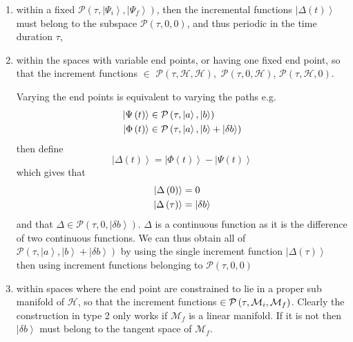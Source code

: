 \documentclass[aps,preprint]{revtex4}
\begin{document}
\begin{enumerate}
\item within a fixed $\mathcal{P}\left( \tau ,\left\vert \Psi
_{i}\right\rangle ,\left\vert \Psi _{f}\right\rangle \right) $, then the
incremental functions $\left\vert \Delta \left( t\right) \right\rangle $
must belong to the subspace $\mathcal{P}\left( \tau ,0,0\right) $, and thus
periodic in the time duration $\tau $,

\item within the spaces with variable end points, or having one fixed end
point, so that the increment functions $\in $ $\mathcal{P}\left( \tau ,%
\mathcal{H},\mathcal{H}\right) ,$ $\mathcal{P}\left( \tau ,0,\mathcal{H}%
\right) $, $\mathcal{P}\left( \tau ,\mathcal{H},0\right) $.

\qquad Varying the end points is equivalent to varying the paths e.g.%
\begin{align}
\left\vert \Psi \left( t\right) \right\rangle & \in \mathcal{P}\left( \tau
,\left\vert a\right\rangle ,\left\vert b\right\rangle \right)   \notag \\
\left\vert \Phi \left( t\right) \right\rangle & \in \mathcal{P}\left( \tau
,\left\vert a\right\rangle ,\left\vert b\right\rangle +\left\vert \delta
b\right\rangle \right) 
\end{align}%
then define 
\begin{equation}
\left\vert \Delta \left( t\right) \right\rangle =\left\vert \Phi \left(
t\right) \right\rangle -\left\vert \Psi \left( t\right) \right\rangle 
\end{equation}%
which gives that 
\begin{align}
\left\vert \Delta \left( 0\right) \right\rangle & =0  \notag \\
\left\vert \Delta \left( \tau \right) \right\rangle & =\left\vert \delta
b\right\rangle 
\end{align}%
and that $\Delta \in \mathcal{P}\left( \tau ,0,\left\vert \delta
b\right\rangle \right) $. $\Delta $ is a continuous function as it is the
difference of two continuous functions. We can thus obtain all of $\mathcal{P%
}\left( \tau ,\left\vert a\right\rangle ,\left\vert b\right\rangle
+\left\vert \delta b\right\rangle \right) $ by using the single increment
function $\left\vert \Delta \left( \tau \right) \right\rangle $ then using
increment functions belonging to $\mathcal{P}\left( \tau ,0,0\right) $

\item within spaces where the end point are constrained to lie in a proper
sub manifold of $\mathcal{H}$, so that the increment functions $\in \mathcal{%
P}\left( \tau ,\mathcal{M}_{i},\mathcal{M}_{f}\right) $. Clearly the
construction in type 2 only works if $\mathcal{M}_{f}$ is a linear manifold.
If it is not then $\left\vert \delta b\right\rangle $ must belong to the
tangent space of $\mathcal{M}_{f}$.


\end{enumerate}
\end{document}
